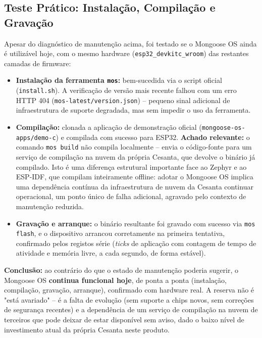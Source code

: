 \documentclass[a4paper,12pt]{article}
\begin{document}
\subsection{Teste Prático: Instalação, Compilação e Gravação}
Apesar do diagnóstico de manutenção acima, foi testado se o Mongoose OS ainda é utilizável hoje, com o mesmo hardware (\texttt{esp32\_devkitc\_wroom}) das restantes camadas de firmware:
\begin{itemize}
    \item \textbf{Instalação da ferramenta \texttt{mos}:} bem-sucedida via o script oficial (\texttt{install.sh}). A verificação de versão mais recente falhou com um erro HTTP 404 (\texttt{mos-latest/version.json}) -- pequeno sinal adicional de infraestrutura de suporte degradada, mas sem impedir o uso da ferramenta.
    \item \textbf{Compilação:} clonada a aplicação de demonstração oficial (\texttt{mongoose-os-apps/demo-c}) e compilada com sucesso para ESP32. \textbf{Achado relevante:} o comando \texttt{mos build} não compila localmente -- envia o código-fonte para um serviço de compilação na nuvem da própria Cesanta, que devolve o binário já compilado. Isto é uma diferença estrutural importante face ao Zephyr e ao ESP-IDF, que compilam inteiramente offline: adotar o Mongoose OS implica uma dependência contínua da infraestrutura de nuvem da Cesanta continuar operacional, um ponto único de falha adicional, agravado pelo contexto de manutenção reduzida.
    \item \textbf{Gravação e arranque:} o binário resultante foi gravado com sucesso via \texttt{mos flash}, e o dispositivo arrancou corretamente na primeira tentativa, confirmado pelos registos série (\textit{ticks} de aplicação com contagem de tempo de atividade e memória livre, a cada segundo, de forma estável).
\end{itemize}

\textbf{Conclusão:} ao contrário do que o estado de manutenção poderia sugerir, o Mongoose OS \textbf{continua funcional hoje}, de ponta a ponta (instalação, compilação, gravação, arranque), confirmado com hardware real. A reserva não é "está avariado" -- é a falta de evolução (sem suporte a chips novos, sem correções de segurança recentes) e a dependência de um serviço de compilação na nuvem de terceiros que pode deixar de estar disponível sem aviso, dado o baixo nível de investimento atual da própria Cesanta neste produto.
\end{document}
